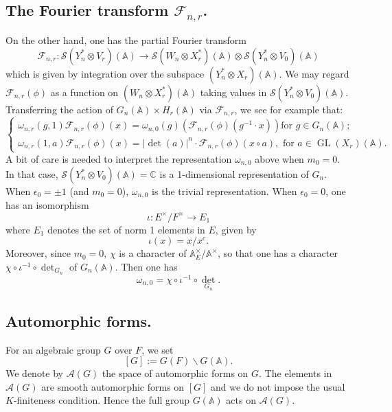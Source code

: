 \documentclass[10pt]{amsart}
\theoremstyle{plain}
\numberwithin{equation}{section}
\begin{document}
\subsection{\bf The Fourier transform $\mathcal{F}_{n,r}$.} 
On the other hand, one has the partial Fourier transform
 \[  
\mathcal{F}_{n,r} :   \mathcal{S}(Y_n^*\otimes V_r)({\mathbb{A}}) \longrightarrow 
 \mathcal{S}(W_n\otimes X_r^*)({\mathbb{A}}) \otimes \mathcal{S}(Y_n^*\otimes
 V_0)({\mathbb{A}})
\]
 which is given by integration over the subspace
$(Y_n^*\otimes X_r)({\mathbb{A}})$. 
 We may regard $\mathcal{F}_{n,r}(\phi)$ as a function 
 on $(W_n\otimes X_r^*)({\mathbb{A}})$ taking values in $\mathcal{S}(Y_n^*\otimes V_0)({\mathbb{A}})$. 
 Transferring the action of $G_n({\mathbb{A}})\times H_r({\mathbb{A}})$ via $\mathcal{F}_{n,r}$,  
 we see for example that:
 \[
 \begin{cases}  \omega_{n,r}(g,1)  \mathcal{F}_{n,r}(\phi) (x) =
   \omega_{n,0}(g) ( \mathcal{F}_{n,r}(\phi)(g^{-1} \cdot x) ) \text{
     for $g \in G_n({\mathbb{A}})$;} \\
 \omega_{n,r}(1,a) \mathcal{F}_{n,r}(\phi)(x)  =  |\det(a)|^n \cdot
 \mathcal{F}_{n,r}(\phi)( x \circ a), \text{ for $a\in {\operatorname{GL}}(X_r)({\mathbb{A}})$.} 
\end{cases} 
\] 
 A bit of care is needed to interpret the representation
 $\omega_{n,0}$ above when $m_0 =0$. In that case,
 $\mathcal{S}(Y_n^*\otimes V_0)({\mathbb{A}})= {\mathbb C}$ is a 1-dimensional
 representation of $G_n$. When $\epsilon_ 0= \pm 1$ (and $m_0 = 0$),
 $\omega_{n,0}$ is
 the trivial representation. 
 When $\epsilon_0 = 0$, one has an isomorphism
 \[  \iota:  E^{\times}/ F^{\times} \longrightarrow E_1 \]
 where $E_1$ denotes the set of norm 1 elements in $E$, given by
 \[  \iota(x)  = x/ x^c. \]
 Moreover, since  $m_0 = 0$, $\chi$ is a character of
 ${\mathbb{A}}_E^{\times}/{\mathbb{A}}^{\times}$, so that one has a character $\chi \circ
 \iota^{-1} \circ \det_{G_n}$ of $G_n({\mathbb{A}})$. Then one has
 \begin{equation} \label{E:omega0}
   \omega_{n,0} = \chi \circ \iota^{-1} \circ {\det}_{G_n}. 
\end{equation}
  
 \vskip 15pt
 
\subsection{\bf Automorphic forms.}
 For an algebraic group $G$ over $F$, we set
\[
    [G]:=G(F)\backslash G({\mathbb{A}}).
\]
We denote by ${\mathcal{A}}(G)$ the space of automorphic forms on $G$. The elements in ${\mathcal{A}}(G)$ are
 smooth automorphic forms on $[G]$ and we do not impose the usual
$K$-finiteness condition. Hence  the full group $G({\mathbb{A}})$ acts on $\mathcal{A}(G)$.  
\end{document}
